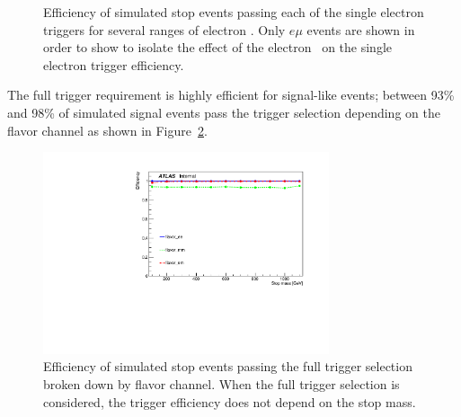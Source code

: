 \begin{figure}[ht]
  \centering
  \caption{
    Efficiency of simulated stop events passing each of the single
    electron triggers for several ranges of electron \ET.
    Only $e\mu$ events are shown in order to show to isolate the effect of
    the electron \ET\ on the single electron trigger efficiency.
  }
  \label{fig:electron_trigger_pt_dependence}
\end{figure}

The full trigger requirement is highly efficient for signal-like events; between
93\% and 98\% of simulated signal events pass the trigger selection depending
on the flavor channel as shown in Figure~\ref{fig:full_trigger_efficiency}.

\begin{figure}[ht]
  \centering
  \includegraphics[width=0.75\textwidth]
    {figs/trigger/EF_e24vhi_medium1_OR_EF_e60_medium1_OR_EF_mu24i_tight_OR_EF_mu36_tight.pdf}
  \caption{
    Efficiency of simulated stop events passing the full trigger
    selection broken down by flavor channel.
    When the full trigger selection is considered, the trigger efficiency does
    not depend on the stop mass.
  }
  \label{fig:full_trigger_efficiency}
\end{figure}

